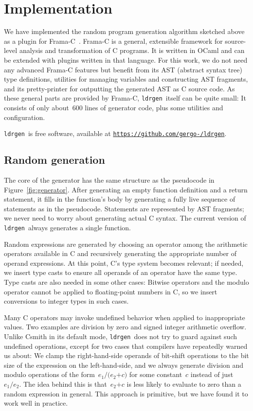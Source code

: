 \documentclass{llncs}
\newcommand\ldrgen{\texttt{ldrgen}}
\begin{document}
\section{Implementation}

We have implemented the random program generation algorithm sketched above
as a plugin for Frama-C~\cite{frama-c}. Frama-C is a general, extensible
framework for source-level analysis and transformation of C programs. It is
written in OCaml and can be extended with plugins written in that language.
For this work, we do not need any advanced Frama-C features but benefit from
its AST (abstract syntax tree) type definitions, utilities for managing
variables and constructing AST fragments, and its pretty-printer for
outputting the generated AST as C source code. As these general parts are
provided by Frama-C, \ldrgen\ itself can be quite small: It consists of only
about~600 lines of generator code, plus some utilities and configuration.

\ldrgen\ is free software, available at
\texttt{\url{https://github.com/gergo-/ldrgen}}.

\subsection{Random generation}
\label{sec:generation}

The core of the generator has the same structure as the pseudocode in
Figure~\ref{fig:generator}. After generating an empty function definition
and a return statement, it fills in the function's body by generating a
fully live sequence of statements as in the pseudocode. Statements are
represented by AST fragments; we never need to worry about generating actual
C syntax. The current version of \ldrgen\ always generates a single
function.

Random expressions are generated by choosing an operator among the
arithmetic operators available in C and recursively generating the
appropriate number of operand expressions. At this point, C's type system
becomes relevant; if needed, we insert type casts to ensure all operands of
an operator have the same type. Type casts are also needed in some other
cases: Bitwise operators and the modulo operator cannot be applied to
floating-point numbers in C, so we insert conversions to integer types in
such cases.

Many C operators may invoke undefined behavior when applied to inappropriate
values. Two examples are division by zero and signed integer arithmetic
overflow. Unlike Csmith in its default mode, \ldrgen\ does not try to guard
against such undefined operations, except for two cases that compilers have
repeatedly warned us about: We clamp the right-hand-side operands of
bit-shift operations to the bit size of the expression on the
left-hand-side, and we always generate division and modulo operations of the
form~\(e_1 \mathtt{/} \mathtt{(}e_2 \mathtt{+} c\mathtt{)}\) for some
constant~\(c\) instead of just~\(e_1 \mathtt{/} e_2\). The idea behind this
is that~\(e_2 \mathtt{+} c\) is less likely to evaluate to zero than a
random expression in general. This approach is primitive, but we have found
it to work well in practice.
\end{document}
